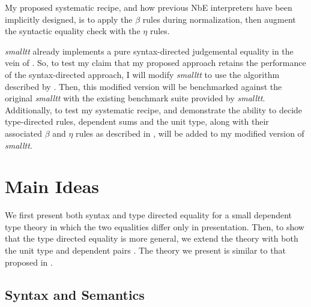\documentclass{article}
\begin{document}
\begin{mathpar}
\end{mathpar}

My proposed systematic recipe, and how previous NbE interpreters have been implicitly designed, is to apply the $\beta$ rules during normalization, then augment the syntactic equality check with the $\eta$ rules.

\hfill\break

\textit{smalltt} already implements a pure syntax-directed judgemental equality in the vein of \citet{Coquand1996}.
So, to test my claim that my proposed approach retains the performance of the syntax-directed approach, I will modify \textit{smalltt} to use the algorithm described by \citet{Chapman2005}.
Then, this modified version will be benchmarked against the original \textit{smalltt} with the existing benchmark suite provided by \textit{smalltt}.
Additionally, to test my systematic recipe, and demonstrate the ability to decide type-directed rules, dependent sums and the unit type, along with their associated $\beta$ and $\eta$ rules as described in \citet{Chapman2005}, will be added to my modified version of \textit{smalltt}.

\section{Main Ideas}


We first present both syntax and type directed equality for a small dependent type theory in which the two equalities differ only in presentation.
Then, to show that the type directed equality is more general, we extend the theory with both the unit type and dependent pairs .
The theory we present is similar to that proposed in \citet{altenkirch2010}.

\subsection{Syntax and Semantics}
\end{document}
